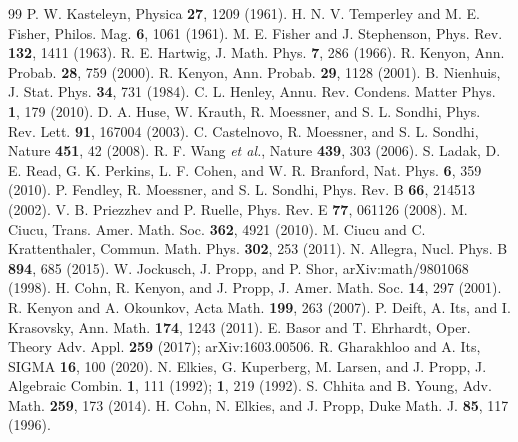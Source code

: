 \documentclass[aps,pre,twocolumn,superscriptaddress,nofootinbib,floatfix]{revtex4-2}
\begin{document}
\begin{thebibliography}{99}
 P. W. Kasteleyn, Physica \textbf{27}, 1209 (1961).
 H. N. V. Temperley and M. E. Fisher, Philos. Mag. \textbf{6}, 1061 (1961).
 M. E. Fisher and J. Stephenson, Phys. Rev. \textbf{132}, 1411 (1963).
 R. E. Hartwig, J. Math. Phys. \textbf{7}, 286 (1966).
 R. Kenyon, Ann. Probab. \textbf{28}, 759 (2000).
 R. Kenyon, Ann. Probab. \textbf{29}, 1128 (2001).
 B. Nienhuis, J. Stat. Phys. \textbf{34}, 731 (1984).
 C. L. Henley, Annu. Rev. Condens. Matter Phys. \textbf{1}, 179 (2010).
 D. A. Huse, W. Krauth, R. Moessner, and S. L. Sondhi, Phys. Rev. Lett. \textbf{91}, 167004 (2003).
 C. Castelnovo, R. Moessner, and S. L. Sondhi, Nature \textbf{451}, 42 (2008).
 R. F. Wang \emph{et al.}, Nature \textbf{439}, 303 (2006).
 S. Ladak, D. E. Read, G. K. Perkins, L. F. Cohen, and W. R. Branford, Nat. Phys. \textbf{6}, 359 (2010).
 P. Fendley, R. Moessner, and S. L. Sondhi, Phys. Rev. B \textbf{66}, 214513 (2002).
 V. B. Priezzhev and P. Ruelle, Phys. Rev. E \textbf{77}, 061126 (2008).
 M. Ciucu, Trans. Amer. Math. Soc. \textbf{362}, 4921 (2010).
 M. Ciucu and C. Krattenthaler, Commun. Math. Phys. \textbf{302}, 253 (2011).
 N. Allegra, Nucl. Phys. B \textbf{894}, 685 (2015).
 W. Jockusch, J. Propp, and P. Shor, arXiv:math/9801068 (1998).
 H. Cohn, R. Kenyon, and J. Propp, J. Amer. Math. Soc. \textbf{14}, 297 (2001).
 R. Kenyon and A. Okounkov, Acta Math. \textbf{199}, 263 (2007).
 P. Deift, A. Its, and I. Krasovsky, Ann. Math. \textbf{174}, 1243 (2011).
 E. Basor and T. Ehrhardt, Oper. Theory Adv. Appl. \textbf{259} (2017); arXiv:1603.00506.
 R. Gharakhloo and A. Its, SIGMA \textbf{16}, 100 (2020).
 N. Elkies, G. Kuperberg, M. Larsen, and J. Propp, J. Algebraic Combin. \textbf{1}, 111 (1992); \textbf{1}, 219 (1992).
 S. Chhita and B. Young, Adv. Math. \textbf{259}, 173 (2014).
 H. Cohn, N. Elkies, and J. Propp, Duke Math. J. \textbf{85}, 117 (1996).

\end{thebibliography}
\end{document}
